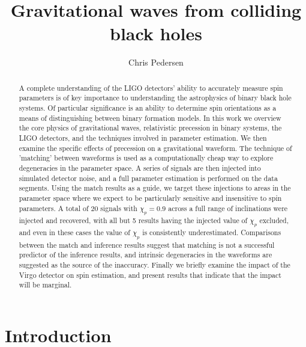 \documentclass[11pt]{article}
\title{Gravitational waves from colliding black holes}
\author{Chris Pedersen}
\begin{document}
\maketitle
\begin{abstract}
A complete understanding of the LIGO detectors' ability to accurately measure spin parameters is of key importance to understanding the astrophysics of binary black hole systems. Of particular significance is an ability to determine spin orientations as a means of distinguishing between binary formation models. In this work we overview the core physics of gravitational waves, relativistic precession in binary systems, the LIGO detectors, and the techniques involved in parameter estimation. We then examine the specific effects of precession on a gravitational waveform. The technique of 'matching' between waveforms is used as a computationally cheap way to explore degeneracies in the parameter space. A series of signals are then injected into simulated detector noise, and a full parameter estimation is performed on the data segments. Using the match results as a guide, we target these injections to areas in the parameter space where we expect to be particularly sensitive and insensitive to spin parameters. A total of 20 signals with $\chi_p=0.9$ across a full range of inclinations were injected and recovered, with all but 5 results having the injected value of $\chi_p$ excluded, and even in these cases the value of $\chi_p$ is consistently underestimated. Comparisons between the match and inference results suggest that matching is not a successful predictor of the inference results, and intrinsic degeneracies in the waveforms are suggested as the source of the inaccuracy. Finally we briefly examine the impact of the Virgo detector on spin estimation, and present results that indicate that the impact will be marginal.
\end{abstract}
\newpage
\tableofcontents
\newpage
\section{Introduction}
\end{document}
